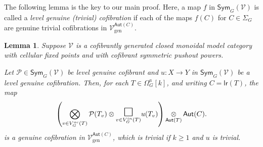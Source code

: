 \documentclass[a4paper,10pt
,draft
]{article}%
\numberwithin{equation}{section}
\numberwithin{figure}{section}
\newtheorem{lemma}[equation]{Lemma}%
\theoremstyle{definition} %
\newcommand{\Sym}{\ensuremath{\mathsf{Sym}}}%
\newcommand{\V}{\ensuremath{\mathcal V}}
\renewcommand{\P}{\ensuremath{\mathcal P}}
\newcommand{\1}{\ensuremath{\mathbbm 1}}%
\begin{document}
The following lemma is the key to our main proof. 
Here, a map $f$ in 
$\mathsf{Sym}_G(\mathcal{V})$ is called
a \textit{level genuine (trivial) cofibration} if each of the maps
$f(C)$ for $C \in \Sigma_G$ are genuine trivial cofibrations in
$\mathcal{V}^{\mathsf{Aut}(C)}_{\text{gen}}$.

\begin{lemma}\label{EXMAINLEM LEM}
	Suppose $\mathcal{V}$ is a cofibrantly generated closed monoidal model category
	with cellular fixed points and
	with cofibrant symmetric pushout powers.
	
	Let $\mathcal{P} \in \mathsf{Sym}_G(\mathcal{V})$
	be level genuine cofibrant
	and  
	$u: X \to Y$ in $\Sym_G(\V)$ be a level genuine cofibration. 
	Then, for each $T \in \Omega^a_G[k]$, and writing
	$C = \mathsf{lr}(T)$, the map	
\begin{equation}\label{EXMAINLEM EQ}
	\left(
		\bigotimes\limits_{v \in V_{G}^{ac}(T)}\P(T_v) \otimes
		\underset{v \in V_{G}^{in}(T)}
	{\mathlarger{\mathlarger{\mathlarger{\square}}}}
		u(T_v)
	\right) 
	\mathop{\otimes}\limits_{\mathsf{Aut}(T)} \mathsf{Aut}(C).
\end{equation}
	is a genuine cofibration in 
	$\mathcal{V}^{\mathsf{Aut}(C)}_{\text{gen}}$,
	which is trivial if $k \geq 1$ and $u$ is trivial.	
\end{lemma}
\end{document}
